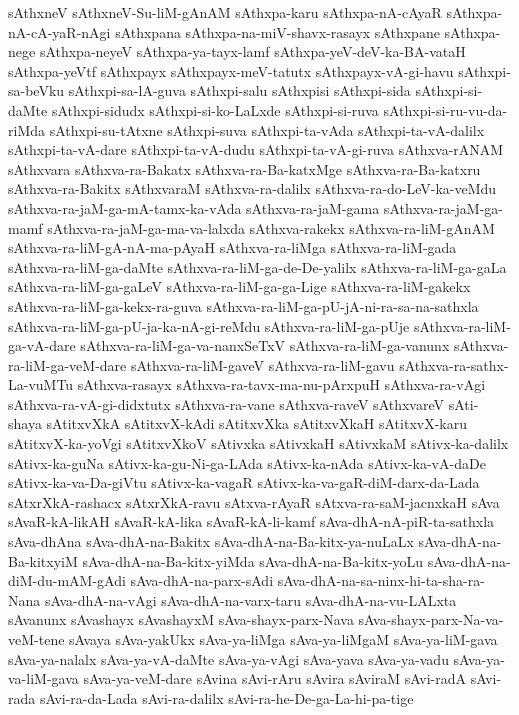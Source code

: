 {sAthxneV
sAthxneV-Su-liM-gAnAM
sAthxpa-karu
sAthxpa-nA-cAyaR
sAthxpa-nA-cA-yaR-nAgi
sAthxpana
sAthxpa-na-miV-shavx-rasayx
sAthxpane
sAthxpa-nege
sAthxpa-neyeV
sAthxpa-ya-tayx-lamf
sAthxpa-yeV-deV-ka-BA-vataH
sAthxpa-yeVtf
sAthxpayx
sAthxpayx-meV-tatutx
sAthxpayx-vA-gi-havu
sAthxpi-sa-beVku
sAthxpi-sa-lA-guva
sAthxpi-salu
sAthxpisi
sAthxpi-sida
sAthxpi-si-daMte
sAthxpi-sidudx
sAthxpi-si-ko-LaLxde
sAthxpi-si-ruva
sAthxpi-si-ru-vu-da-riMda
sAthxpi-su-tAtxne
sAthxpi-suva
sAthxpi-ta-vAda
sAthxpi-ta-vA-dalilx
sAthxpi-ta-vA-dare
sAthxpi-ta-vA-dudu
sAthxpi-ta-vA-gi-ruva
sAthxva-rANAM
sAthxvara
sAthxva-ra-Bakatx
sAthxva-ra-Ba-katxMge
sAthxva-ra-Ba-katxru
sAthxva-ra-Bakitx
sAthxvaraM
sAthxva-ra-dalilx
sAthxva-ra-do-LeV-ka-veMdu
sAthxva-ra-jaM-ga-mA-tamx-ka-vAda
sAthxva-ra-jaM-gama
sAthxva-ra-jaM-ga-mamf
sAthxva-ra-jaM-ga-ma-va-lalxda
sAthxva-rakekx
sAthxva-ra-liM-gAnAM
sAthxva-ra-liM-gA-nA-ma-pAyaH
sAthxva-ra-liMga
sAthxva-ra-liM-gada
sAthxva-ra-liM-ga-daMte
sAthxva-ra-liM-ga-de-De-yalilx
sAthxva-ra-liM-ga-gaLa
sAthxva-ra-liM-ga-gaLeV
sAthxva-ra-liM-ga-ga-Lige
sAthxva-ra-liM-gakekx
sAthxva-ra-liM-ga-kekx-ra-guva
sAthxva-ra-liM-ga-pU-jA-ni-ra-sa-na-sathxla
sAthxva-ra-liM-ga-pU-ja-ka-nA-gi-reMdu
sAthxva-ra-liM-ga-pUje
sAthxva-ra-liM-ga-vA-dare
sAthxva-ra-liM-ga-va-nanxSeTxV
sAthxva-ra-liM-ga-vanunx
sAthxva-ra-liM-ga-veM-dare
sAthxva-ra-liM-gaveV
sAthxva-ra-liM-gavu
sAthxva-ra-sathx-La-vuMTu
sAthxva-rasayx
sAthxva-ra-tavx-ma-nu-pArxpuH
sAthxva-ra-vAgi
sAthxva-ra-vA-gi-didxtutx
sAthxva-ra-vane
sAthxva-raveV
sAthxvareV
sAti-shaya
sAtitxvXkA
sAtitxvX-kAdi
sAtitxvXka
sAtitxvXkaH
sAtitxvX-karu
sAtitxvX-ka-yoVgi
sAtitxvXkoV
sAtivxka
sAtivxkaH
sAtivxkaM
sAtivx-ka-dalilx
sAtivx-ka-guNa
sAtivx-ka-gu-Ni-ga-LAda
sAtivx-ka-nAda
sAtivx-ka-vA-daDe
sAtivx-ka-va-Da-giVtu
sAtivx-ka-vagaR
sAtivx-ka-va-gaR-diM-darx-da-Lada
sAtxrXkA-rashacx
sAtxrXkA-ravu
sAtxva-rAyaR
sAtxva-ra-saM-jacnxkaH
sAva
sAvaR-kA-likAH
sAvaR-kA-lika
sAvaR-kA-li-kamf
sAva-dhA-nA-piR-ta-sathxla
sAva-dhAna
sAva-dhA-na-Bakitx
sAva-dhA-na-Ba-kitx-ya-nuLaLx
sAva-dhA-na-Ba-kitxyiM
sAva-dhA-na-Ba-kitx-yiMda
sAva-dhA-na-Ba-kitx-yoLu
sAva-dhA-na-diM-du-mAM-gAdi
sAva-dhA-na-parx-sAdi
sAva-dhA-na-sa-ninx-hi-ta-sha-ra-Nana
sAva-dhA-na-vAgi
sAva-dhA-na-varx-taru
sAva-dhA-na-vu-LALxta
sAvanunx
sAvashayx
sAvashayxM
sAva-shayx-parx-Nava
sAva-shayx-parx-Na-va-veM-tene
sAvaya
sAva-yakUkx
sAva-ya-liMga
sAva-ya-liMgaM
sAva-ya-liM-gava
sAva-ya-nalalx
sAva-ya-vA-daMte
sAva-ya-vAgi
sAva-yava
sAva-ya-vadu
sAva-ya-va-liM-gava
sAva-ya-veM-dare
sAvina
sAvi-rAru
sAvira
sAviraM
sAvi-radA
sAvi-rada
sAvi-ra-da-Lada
sAvi-ra-dalilx
sAvi-ra-he-De-ga-La-hi-pa-tige
}
